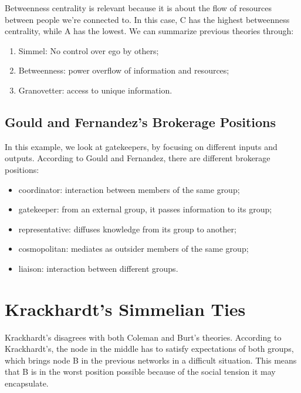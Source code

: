 \documentclass[
  notitlepage,
  onecolumn,
  openany]{book}
\providecommand{\tightlist}{%
  \setlength{\itemsep}{0pt}\setlength{\parskip}{0pt}}
\begin{document}
Betweenness centrality is relevant because it is about the flow of resources between people we're connected to. In this case, C has the highest betweenness centrality, while A has the lowest. We can summarize previous theories through:

\begin{enumerate}
\def\labelenumi{\arabic{enumi}.}
\tightlist
\item
  Simmel: No control over ego by others;
\item
  Betweenness: power overflow of information and resources;
\item
  Granovetter: access to unique information.
\end{enumerate}

\hypertarget{gould-and-fernandezs-brokerage-positions}{%
\subsection{Gould and Fernandez's Brokerage Positions}\label{gould-and-fernandezs-brokerage-positions}}

In this example, we look at gatekeepers, by focusing on different inputs and outputs. According to Gould and Fernandez, there are different brokerage positions:

\begin{itemize}
\tightlist
\item
  coordinator: interaction between members of the same group;
\item
  gatekeeper: from an external group, it passes information to its group;
\item
  representative: diffuses knowledge from its group to another;
\item
  cosmopolitan: mediates as outsider members of the same group;
\item
  liaison: interaction between different groups.
\end{itemize}

\hypertarget{krackhardts-simmelian-ties}{%
\section{Krackhardt's Simmelian Ties}\label{krackhardts-simmelian-ties}}

Krackhardt's disagrees with both Coleman and Burt's theories. According to Krackhardt's, the node in the middle has to satisfy expectations of both groups, which brings node B in the previous networks in a difficult situation. This means that B is in the worst position possible because of the social tension it may encapsulate.
\end{document}
